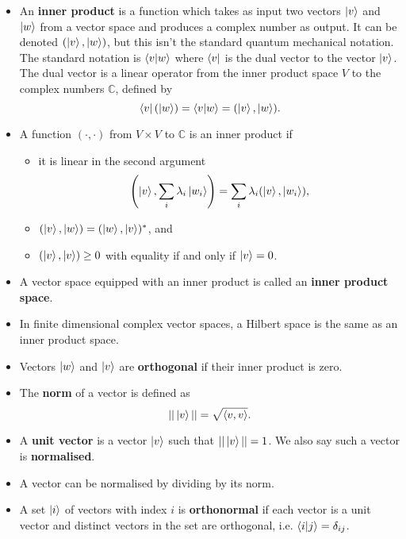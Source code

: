 \documentclass{article}
\begin{document}
\begin{itemize}
  \item An \textbf{inner product} is a function which takes as input two vectors $\ket{v}$ and $\ket{w}$ from a vector space and produces a complex number as output. It can be denoted $(\ket{v}, \ket{w})$, but this isn't the standard quantum mechanical notation. The standard notation is $\braket{v | w}$ where $\bra{v}$ is the dual vector to the vector $\ket{v}$. The dual vector is a linear operator from the inner product space $V$ to the complex numbers $\mathbb{C}$, defined by \[\bra{v} (\ket{w}) = \braket{v | w} = (\ket{v}, \ket{w}).\]

  \item A function $(\cdot, \cdot)$ from $V \times V$ to $\mathbb{C}$ is an inner product if

        \begin{itemize}
          \item it is linear in the second argument \[\left( \ket{v}, \sum_i \lambda_i \ket{w_i} \right) = \sum_i \lambda_i (\ket{v}, \ket{w_i}),\]

          \item $(\ket{v}, \ket{w}) = (\ket{w}, \ket{v})^*$, and

          \item $(\ket{v}, \ket{v}) \ge 0$ with equality if and only if $\ket{v} = 0$.
        \end{itemize}

  \item A vector space equipped with an inner product is called an \textbf{inner product space}.

  \item In finite dimensional complex vector spaces, a Hilbert space is the same as an inner product space.

  \item Vectors $\ket{w}$ and $\ket{v}$ are \textbf{orthogonal} if their inner product is zero.

  \item The \textbf{norm} of a vector is defined as \[||\ket{v}|| = \sqrt{\braket{v, v}}.\]

  \item A \textbf{unit vector} is a vector $\ket{v}$ such that $||\ket{v}|| = 1$. We also say such a vector is \textbf{normalised}.

  \item A vector can be normalised by dividing by its norm.

  \item A set $\ket{i}$ of vectors with index $i$ is \textbf{orthonormal} if each vector is a unit vector and distinct vectors in the set are orthogonal, i.e. $\braket{i | j} = \delta_{i j}$.


\end{itemize}
\end{document}
